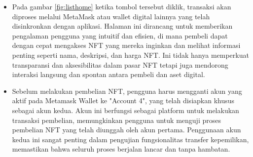 \begin{itemize}
        \item Pada gambar \ref{fig:listhome} ketika tombol tersebut diklik, transaksi akan diproses melalui MetaMask atau wallet digital lainnya yang telah disinkronkan dengan aplikasi. Halaman ini dirancang untuk memberikan pengalaman pengguna yang intuitif dan efisien, di mana pembeli dapat dengan cepat mengakses NFT yang mereka inginkan dan melihat informasi penting seperti nama, deskripsi, dan harga NFT. Ini tidak hanya memperkuat transparansi dan aksesibilitas dalam pasar NFT tetapi juga mendorong interaksi langsung dan spontan antara pembeli dan aset digital.

      \item Sebelum melakukan pembelian NFT, pengguna harus mengganti akun yang aktif pada Metamask Wallet ke "Account 4", yang telah disiapkan khusus sebagai akun kedua. Akun ini berfungsi sebagai platform untuk melakukan transaksi pembelian, memungkinkan pengguna untuk menguji proses pembelian NFT yang telah diunggah oleh akun pertama. Penggunaan akun kedua ini sangat penting dalam pengujian fungsionalitas transfer kepemilikan, memastikan bahwa seluruh proses berjalan lancar dan tanpa hambatan. 
      

\end{itemize}
